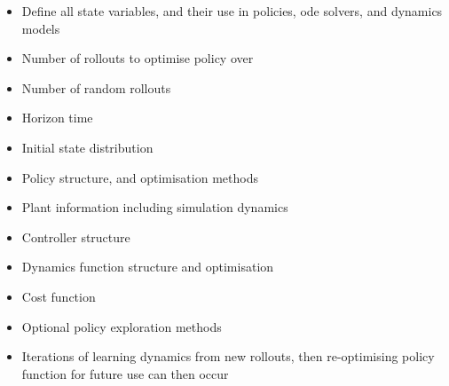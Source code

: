 \documentclass[twoside,twocolumn,12pt]{article}
\begin{document}
\begin{itemize}
\item Define all state variables, and their use in policies, ode solvers, and dynamics models
\item Number of rollouts to optimise policy over 
\item Number of random rollouts
\item Horizon time
\item Initial state distribution
\item Policy structure, and optimisation methods
\item Plant information including simulation dynamics
\item Controller structure
\item Dynamics function structure and optimisation
\item Cost function
\item Optional policy exploration methods
\item Iterations of learning dynamics from new rollouts, then re-optimising policy function for future use can then occur
\end{itemize}
\end{document}
